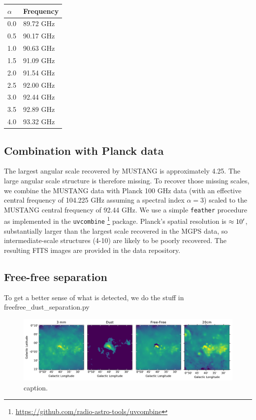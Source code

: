 \documentclass[twocolumn]{aastex62}
\begin{document}
\begin{table}[htp]
\begin{tabular}{ll}
    \label{tab:centralfreq}
$\alpha$ & Frequency \\
\hline
0.0 & 89.72 GHz \\
0.5 & 90.17 GHz \\
1.0 & 90.63 GHz \\
1.5 & 91.09 GHz \\
2.0 & 91.54 GHz \\
2.5 & 92.00 GHz \\
3.0 & 92.44 GHz \\
3.5 & 92.89 GHz \\
4.0 & 93.32 GHz \\
\hline
\end{tabular}
\end{table}

\subsection{Combination with Planck data}
The largest angular scale recovered by MUSTANG is approximately 4.25\arcmin.
The large angular scale structure is therefore missing.  To recover those
missing scales, we combine the MUSTANG data with
Planck 100 GHz data (with an effective central frequency of 104.225 GHz
assuming a spectral index $\alpha=3$) scaled to the MUSTANG central frequency
of 92.44 GHz.  We use a simple \texttt{feather} procedure \citep{Cotton2017a}
as implemented in the \texttt{uvcombine}
\footnote{\url{https://github.com/radio-astro-tools/uvcombine}} package.
Planck's spatial resolution is $\approx10\mbox{$^\prime$}$, substantially larger
than the largest scale recovered in the MGPS data, so intermediate-scale
structures (4-10\arcmin) are likely to be poorly recovered.
The resulting FITS images are provided in the data repository.

\subsection{Free-free separation}
To get a better sense of what is detected, we do the stuff in freefree\_dust\_separation.py

\begin{figure}[htp]
    \includegraphics[width=17cm]{figures/G01_sgrb2.pdf}
    \caption{caption.}
\label{fig:sgrb2_freefree}
\end{figure}
\end{document}
